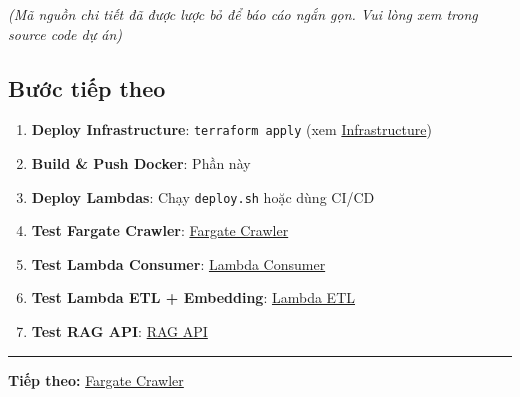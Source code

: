 \emph{(Mã nguồn chi tiết đã được lược bỏ để báo cáo ngắn gọn. Vui lòng
xem trong source code dự án)}

\hypertarget{bux1b0ux1edbc-tiux1ebfp-theo}{%
\subsection{Bước tiếp theo}}

\begin{enumerate}
\def\labelenumi{\arabic{enumi}.}
\tightlist
\item
  \textbf{Deploy Infrastructure}: \texttt{terraform\ apply} (xem
  \href{5.3-Infrastructure/}{Infrastructure})
\item
  \textbf{Build \& Push Docker}: Phần này
\item
  \textbf{Deploy Lambdas}: Chạy \texttt{deploy.sh} hoặc dùng CI/CD
\item
  \textbf{Test Fargate Crawler}: \href{5.10-Fargate-Crawler/}{Fargate
  Crawler}
\item
  \textbf{Test Lambda Consumer}: \href{5.11-Lambda-Consumer/}{Lambda
  Consumer}
\item
  \textbf{Test Lambda ETL + Embedding}: \href{5.12-Lambda-ETL/}{Lambda
  ETL}
\item
  \textbf{Test RAG API}: \href{5.13-RAG-API/}{RAG API}
\end{enumerate}

\begin{center}\rule{0.5\linewidth}{0.5pt}\end{center}

\textbf{Tiếp theo:} \href{5.10-Fargate-Crawler/}{Fargate Crawler}
